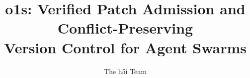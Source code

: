 \newcommand{\sys}{\textnormal{o1s}}
\newcommand{\code}[1]{\texttt{\small #1}}
\setlength{\emergencystretch}{1.5em}
\setlength{\parskip}{0pt plus 3pt}
\renewcommand{\figurename}{Fig.}
\newcommand{\past}{\operatorname{Past}}
\newcommand{\deps}{\operatorname{deps}}
\newcommand{\heads}{\operatorname{Heads}}
\newcommand{\Live}{\operatorname{Live}}
\newcommand{\Seg}{\operatorname{Seg}}
\newcommand{\Prec}{\operatorname{Prec}}
\newcommand{\Obs}{\operatorname{Obs}}
\newcommand{\Ok}{\mathsf{Ok}}
\newcommand{\Err}{\mathsf{Err}}
\newtheorem{definition}{Definition}
\newtheorem{claim}{Theorem}
\title[o1s: Verified Version Control for Agent Swarms]{o1s: Verified Patch Admission and Conflict-Preserving\texorpdfstring{\\}{ }Version Control for Agent Swarms}
\author{The h5i Team}
\renewcommand{\shortauthors}{The h5i Team}

